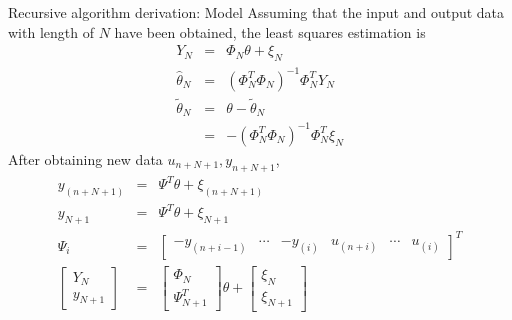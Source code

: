 \begin{frame}{ Recursive algorithm derivation: Model }
Assuming that the input and output data with length of $N$ have been obtained, the least squares estimation is 
\begin{eqnarray*}
Y_N &=& \Phi_N\theta+\xi_N \\
\hat\theta_N &=& (\Phi_N^T\Phi_N)^{-1}\Phi_N^T Y_N \\
\tilde\theta_N &=& \theta-\tilde\theta_N \\
&=& -(\Phi_N^T\Phi_N)^{-1}\Phi_N^T\xi_N
\end{eqnarray*}
After obtaining new data $u_{n+N+1},y_{n+N+1}$,
\begin{eqnarray*}
y_{(n+N+1)} &=& \Psi^T\theta+\xi_{(n+N+1)} \\
y_{N+1} &=& \Psi^T\theta+\xi_{N+1} \\
\Psi_i &=& \begin{bmatrix} -y_{(n+i-1)} & \cdots & -y_{(i)} & u_{(n+i)} & \cdots & u_{(i)} \end{bmatrix}^T  \\
\begin{bmatrix} Y_N \\ y_{N+1} \end{bmatrix} &=& 
\begin{bmatrix} \Phi_N \\ \Psi_{N+1}^T \end{bmatrix} \theta +
\begin{bmatrix} \xi_N \\ \xi_{N+1} \end{bmatrix} 
\end{eqnarray*}
\end{frame}

